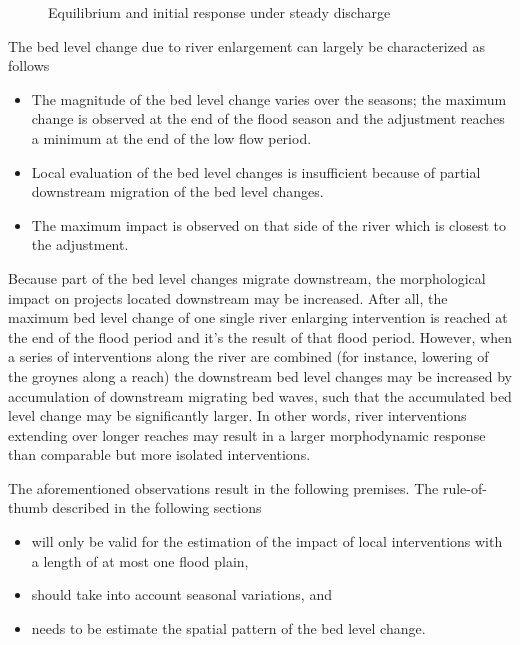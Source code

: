 \begin{figure}
\center
\resizebox{13cm}{!}{
   
}
\caption{Equilibrium and initial response under steady discharge}
\label{Fig:response}
\end{figure}

The bed level change due to river enlargement can largely be characterized as follows

\begin{itemize}
\item The magnitude of the bed level change varies over the seasons; the maximum change is observed at the end of the flood season and the adjustment reaches a minimum at the end of the low flow period.

\item Local evaluation of the bed level changes is insufficient because of partial downstream migration of the bed level changes.

\item The maximum impact is observed on that side of the river which is closest to the adjustment.
\end{itemize}

Because part of the bed level changes migrate downstream, the morphological impact on projects located downstream may be increased.
After all, the maximum bed level change of one single river enlarging intervention is reached at the end of the flood period and it's the result of that flood period.
However, when a series of interventions along the river are combined (for instance, lowering of the groynes along a reach) the downstream bed level changes may be increased by accumulation of downstream migrating bed waves, such that the accumulated bed level change may be significantly larger.
In other words, river interventions extending over longer reaches may result in a larger morphodynamic response than comparable but more isolated interventions.

The aforementioned observations result in the following premises.
The rule-of-thumb described in the following sections

\begin{itemize}
\item will only be valid for the estimation of the impact of local interventions with a length of at most one flood plain,

\item should take into account seasonal variations, and

\item needs to be estimate the spatial pattern of the bed level change.
\end{itemize}


